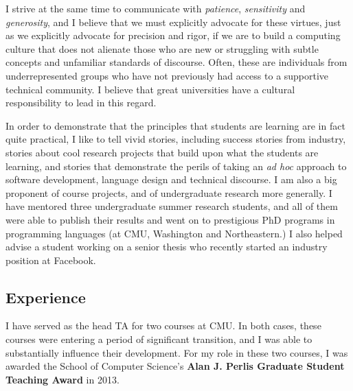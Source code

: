 \documentclass[9pt]{extarticle}
\begin{document}
I strive at the same time to communicate with \emph{patience}, \emph{sensitivity} and \emph{generosity}, and I believe that we must explicitly advocate for these virtues, just as we explicitly advocate for precision and rigor, if we are to build a computing culture that does not alienate those who are new or struggling with subtle concepts and unfamiliar standards of discourse. Often, these are individuals from underrepresented groups who have not previously had access to a supportive technical community. I believe that great universities have a cultural responsibility to lead in this regard.

In order to demonstrate that the principles that students are learning are in fact quite practical, I like to tell vivid stories, including success stories from industry, stories about cool research projects that build upon what the students are learning, and stories that demonstrate the perils of taking an \emph{ad hoc} approach to software development, language design and technical discourse. I am also a big proponent of course projects, and of undergraduate research more generally. I have mentored three undergraduate summer research students, and all of them were able to publish their results and went on to prestigious PhD programs in programming languages (at CMU, Washington and Northeastern.) I also helped advise a student working on a senior thesis who recently started an industry position at Facebook. %





\subsection*{Experience}
I have served as the head TA for two courses at CMU. In both cases, these courses were entering a period of significant transition, and I was able to substantially influence their development. For my role in these two courses, I was awarded the School of Computer Science's \textbf{Alan J. Perlis Graduate Student Teaching Award} in 2013.
\end{document}

